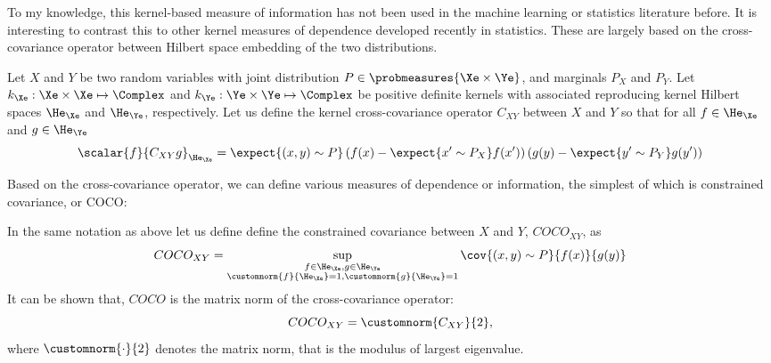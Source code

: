 To my knowledge, this kernel-based measure of information has not been used in the machine learning or statistics literature before. It is interesting to contrast this to other kernel measures of dependence developed recently in statistics. These are largely based on the cross-covariance operator between Hilbert space embedding of the two distributions.

\begin{definition}
	Let $X$ and $Y$ be two random variables with joint distribution $P\in\probmeasures{\Xe\times\Ye}$, and marginals $P_X$ and $P_Y$. Let $k_{\Xe}:\Xe\times\Xe\mapsto\Complex$ and $k_{\Ye}:\Ye\times\Ye\mapsto\Complex$ be positive definite kernels with associated reproducing kernel Hilbert spaces $\He_\Xe$ and $\He_\Ye$, respectively. Let us define the kernel cross-covariance operator $C_{XY}$ between $X$ and $Y$ so that for all $f\in\He_\Xe$ and $g\in\He_\Ye$
	\begin{equation}
		\scalar{f}{C_{XY}g}_{\He_\Xe} = \expect{(x,y) \sim P} \left( f(x) - \expect{x'\sim P_X} f(x')\right) \left( g(y) - \expect{y' \sim P_Y} g(y')\right)
	\end{equation}
\end{definition}

Based on the cross-covariance operator, we can define various measures of dependence or information, the simplest of which is constrained covariance, or COCO:

\begin{definition}
	In the same notation as above let us define define the constrained covariance between $X$ and $Y$, $COCO_{XY}$, as
	\begin{equation}
		COCO_{XY}=\sup_{\substack{f\in\He_\Xe, g\in\He_\Ye \\\customnorm{f}{\He_\Xe}=1,\customnorm{g}{\He_\Ye}=1}} \cov{(x,y)\sim P}{f(x)}{g(y)}
	\end{equation}
	It can be shown that, $COCO$ is the matrix norm of the cross-covariance operator:
	\begin{equation}
		COCO_{XY} = \customnorm{C_{XY}}{2},
	\end{equation}
	where $\customnorm{\cdot}{2}$ denotes the matrix norm, that is the modulus of largest eigenvalue. 
\end{definition}

